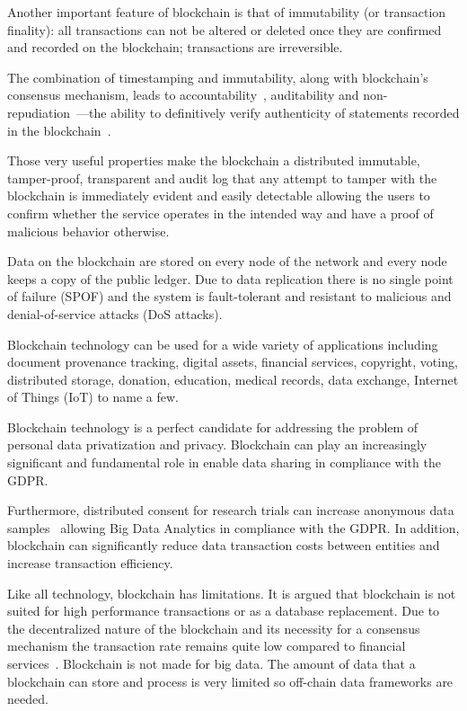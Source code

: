 Another important feature of blockchain is that of immutability (or transaction finality): all transactions can not be altered or deleted once they are confirmed and recorded on the blockchain; transactions are irreversible.

The combination of timestamping and immutability, along with blockchain's consensus mechanism, leads to  accountability~\cite{10.1007/978-3-540-46588-1_20}, auditability and non-repudiation~\cite{non_repudiation}---the ability
to definitively verify authenticity of statements recorded in the blockchain~\cite{bl_auditability}.

Those very useful properties make the blockchain a distributed immutable, tamper-proof, transparent and audit log that any attempt to tamper with the  blockchain is immediately evident and easily detectable allowing the users to confirm whether the service operates in the intended way and have a proof of malicious behavior otherwise.

Data on the blockchain are stored on every node of the network and every node keeps a copy of the public ledger. Due to data replication there is no single point of failure (SPOF) and the system is fault-tolerant and resistant to malicious and denial-of-service attacks (DoS attacks).

Blockchain technology can be used for a wide variety of applications including document provenance tracking, digital assets, financial services, copyright, voting, distributed storage, donation, education, medical records, data exchange, Internet of Things (IoT) to name a few.

Blockchain technology is a perfect candidate for addressing the problem of personal data privatization and privacy. Blockchain can play an increasingly significant and fundamental role in enable data sharing in compliance with the GDPR.

Furthermore, distributed consent for research trials can increase anonymous data samples~\cite{ibm} allowing Big Data Analytics in compliance with the GDPR. In addition, blockchain can significantly reduce data transaction costs between entities and increase transaction efficiency.

Like all technology, blockchain has limitations. It is argued that blockchain is not suited for high performance transactions or as a database replacement. Due to the decentralized nature of the blockchain and its necessity for a consensus mechanism the transaction rate remains quite low compared to financial services~\cite{Sompolinsky2015, Zohar:2015:BUH:2817191.2701411}. Blockchain is not made for big data. The amount of data that a blockchain can store and process is very limited so off-chain data frameworks are needed.
